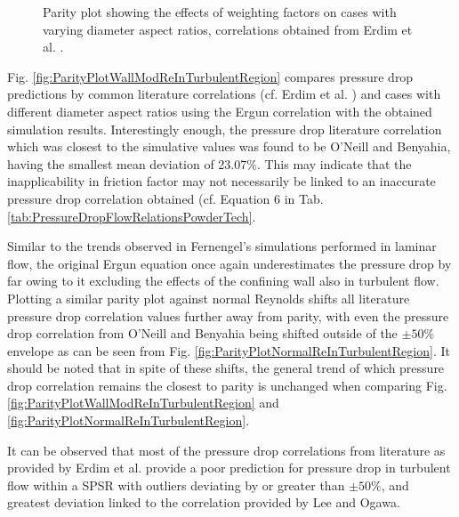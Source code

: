 \begin{figure} [H]
%
	\caption[Parity plot showing the effects of weighting factors on cases with varying diameter aspect ratios, correlations obtained from Erdim et al.]{Parity plot showing the effects of weighting factors on cases with varying diameter aspect ratios, correlations obtained from Erdim et al. \cite{Erdim2015}.}%
	\label{fig:ParityPlotWallModReInTurbulentRegion_ComparisonOfDCasesWithWeightingFactors}%
\end{figure}
Fig. \ref{fig:ParityPlotWallModReInTurbulentRegion} compares pressure drop predictions by common literature correlations (cf. Erdim et al. \cite{Erdim2015}) and cases with different diameter aspect ratios using the Ergun correlation with the obtained simulation results. Interestingly enough, the pressure drop literature correlation which was closest to the simulative values was found to be O'Neill and Benyahia, having the smallest mean deviation of 23.07\%. This may indicate that the inapplicability in friction factor may not necessarily be linked to an inaccurate pressure drop correlation obtained (cf. Equation 6 in Tab. \ref{tab:PressureDropFlowRelationsPowderTech}.

Similar to the trends observed in Fernengel's simulations performed in laminar flow, the original Ergun equation \cite{Ergun1952} once again underestimates the pressure drop by far owing to it excluding the effects of the confining wall also in turbulent flow.
Plotting a similar parity plot against normal Reynolds shifts all literature pressure drop correlation values further away from parity, with even the pressure drop correlation from O'Neill and Benyahia being shifted outside of the $\pm50\%$ envelope as can be seen from Fig. \ref{fig:ParityPlotNormalReInTurbulentRegion}. It should be noted that in spite of these shifts, the general trend of which pressure drop correlation remains the closest to parity is unchanged when comparing Fig. \ref{fig:ParityPlotWallModReInTurbulentRegion} and \ref{fig:ParityPlotNormalReInTurbulentRegion}.

It can be observed that most of the pressure drop correlations from literature as provided by Erdim et al. \cite{Erdim2015} provide a poor prediction for pressure drop in turbulent flow within a SPSR with outliers deviating by or greater than $\pm50\%$, and greatest deviation linked to the correlation provided by Lee and Ogawa.

